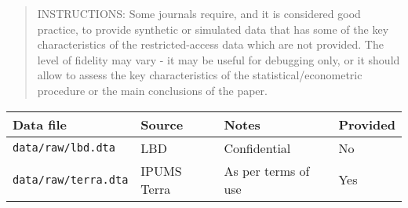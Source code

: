 \documentclass[
]{article}
\begin{document}
\begin{quote}
INSTRUCTIONS: Some journals require, and it is considered good practice,
to provide synthetic or simulated data that has some of the key
characteristics of the restricted-access data which are not provided.
The level of fidelity may vary - it may be useful for debugging only, or
it should allow to assess the key characteristics of the
statistical/econometric procedure or the main conclusions of the paper.
\end{quote}

\begin{longtable}[]{@{}llll@{}}
\toprule
\begin{minipage}[b]{0.26\columnwidth}\raggedright
Data file\strut
\end{minipage} & \begin{minipage}[b]{0.19\columnwidth}\raggedright
Source\strut
\end{minipage} & \begin{minipage}[b]{0.23\columnwidth}\raggedright
Notes\strut
\end{minipage} & \begin{minipage}[b]{0.21\columnwidth}\raggedright
Provided\strut
\end{minipage}\tabularnewline
\midrule
\endhead
\begin{minipage}[t]{0.26\columnwidth}\raggedright
\texttt{data/raw/lbd.dta}\strut
\end{minipage} & \begin{minipage}[t]{0.19\columnwidth}\raggedright
LBD\strut
\end{minipage} & \begin{minipage}[t]{0.23\columnwidth}\raggedright
Confidential\strut
\end{minipage} & \begin{minipage}[t]{0.21\columnwidth}\raggedright
No\strut
\end{minipage}\tabularnewline
\begin{minipage}[t]{0.26\columnwidth}\raggedright
\texttt{data/raw/terra.dta}\strut
\end{minipage} & \begin{minipage}[t]{0.19\columnwidth}\raggedright
IPUMS Terra\strut
\end{minipage} & \begin{minipage}[t]{0.23\columnwidth}\raggedright
As per terms of use\strut
\end{minipage} & \begin{minipage}[t]{0.21\columnwidth}\raggedright
Yes\strut

\end{minipage}
\end{longtable}
\end{document}
